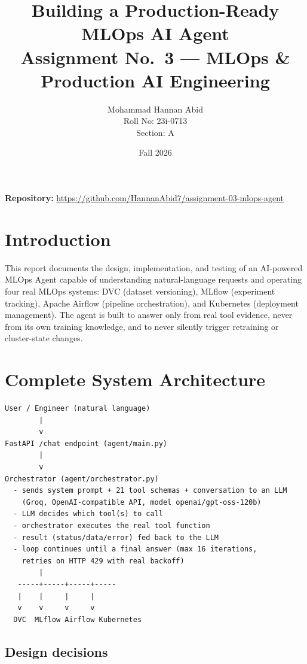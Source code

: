 \documentclass[11pt,a4paper]{article}
\title{\textbf{Building a Production-Ready MLOps AI Agent}\\[0.3em]
\large Assignment No.\ 3 --- MLOps \& Production AI Engineering}
\author{Mohammad Hannan Abid \\ Roll No: 23i-0713 \\ Section: A}
\date{Fall 2026}
\begin{document}
\maketitle
\thispagestyle{empty}

\begin{center}
\textbf{Repository:} \url{https://github.com/HannanAbid7/assignment-03-mlops-agent}
\end{center}

\newpage
\tableofcontents
\newpage

\section{Introduction}

This report documents the design, implementation, and testing of an
AI-powered MLOps Agent capable of understanding natural-language requests
and operating four real MLOps systems: DVC (dataset versioning), MLflow
(experiment tracking), Apache Airflow (pipeline orchestration), and
Kubernetes (deployment management). The agent is built to answer only from
real tool evidence, never from its own training knowledge, and to never
silently trigger retraining or cluster-state changes.

\section{Complete System Architecture}

\begin{center}
\begin{verbatim}
User / Engineer (natural language)
        |
        v
FastAPI /chat endpoint (agent/main.py)
        |
        v
Orchestrator (agent/orchestrator.py)
  - sends system prompt + 21 tool schemas + conversation to an LLM
    (Groq, OpenAI-compatible API, model openai/gpt-oss-120b)
  - LLM decides which tool(s) to call
  - orchestrator executes the real tool function
  - result (status/data/error) fed back to the LLM
  - loop continues until a final answer (max 16 iterations,
    retries on HTTP 429 with real backoff)
        |
   -----+-----+-----+-----
   |    |     |     |
   v    v     v     v
  DVC  MLflow Airflow Kubernetes
\end{verbatim}
\end{center}

\subsection{Design decisions}
\end{document}

